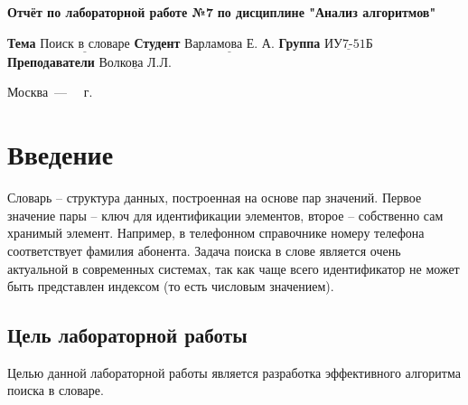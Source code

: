 \documentclass[12pt]{report}
\begin{document}
\begin{titlepage}
		
		\begin{center}
			\noindent\begin{minipage}{1.3\textwidth}\centering
				\Large\textbf{  Отчёт по лабораторной работе №7}\newline
				\textbf{по дисциплине "Анализ алгоритмов"}\newline\newline
			\end{minipage}
		\end{center}
		
		\noindent\textbf{Тема} $\underline{\text{Поиск в словаре}}$\newline\newline
		\noindent\textbf{Студент} $\underline{\text{Варламова Е. А.}}$\newline\newline
		\noindent\textbf{Группа} $\underline{\text{ИУ7-51Б}}$\newline\newline
		\noindent\textbf{Преподаватели} $\underline{\text{Волкова Л.Л.}}$\newline\newline\newline
		
		\begin{center}
			\vfill
			Москва~---~\the\year
			~г.
		\end{center}
	\end{titlepage}
	
\setcounter{page}{2}	
	\tableofcontents
	
\newpage
\chapter*{Введение}
	
Словарь  -- структура данных, построенная  на  основе  пар  значений.  Первое  значение  пары -- ключ  для идентификации элементов, второе  -- собственно сам хранимый элемент. Например, в телефонном справочнике номеру  телефона  соответствует  фамилия  абонента. Задача поиска в слове является очень актуальной в современных системах, так как чаще всего идентификатор не может быть представлен индексом (то есть числовым значением).
	
\section*{Цель лабораторной работы}
	
Целью данной лабораторной работы является разработка эффективного алгоритма поиска в словаре.
	
\end{document}

